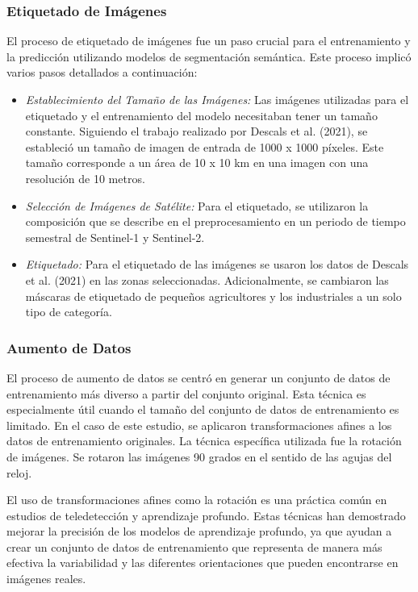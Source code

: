 \subsubsection{Etiquetado de Imágenes}
El proceso de etiquetado de imágenes fue un paso crucial para el entrenamiento y la predicción utilizando modelos de segmentación semántica. Este proceso implicó varios pasos detallados a continuación:

\begin{itemize}
    \item \textit{Establecimiento del Tamaño de las Imágenes:} Las imágenes utilizadas para el etiquetado y el entrenamiento del modelo necesitaban tener un tamaño constante. Siguiendo el trabajo realizado por Descals et al. (2021), se estableció un tamaño de imagen de entrada de 1000 x 1000 píxeles. Este tamaño corresponde a un área de 10 x 10 km en una imagen con una resolución de 10 metros.
    
    \item \textit{Selección de Imágenes de Satélite:} Para el etiquetado, se utilizaron la composición que se describe en el preprocesamiento en un periodo de tiempo semestral de Sentinel-1 y Sentinel-2.
    
    \item \textit{Etiquetado:} Para el etiquetado de las imágenes se usaron los datos de Descals et al. (2021) en las zonas seleccionadas. Adicionalmente, se cambiaron las máscaras de etiquetado de pequeños agricultores y los industriales a un solo tipo de categoría.
\end{itemize}

\subsubsection{Aumento de Datos}
El proceso de aumento de datos se centró en generar un conjunto de datos de entrenamiento más diverso a partir del conjunto original. Esta técnica es especialmente útil cuando el tamaño del conjunto de datos de entrenamiento es limitado. En el caso de este estudio, se aplicaron transformaciones afines a los datos de entrenamiento originales. La técnica específica utilizada fue la rotación de imágenes. Se rotaron las imágenes 90 grados en el sentido de las agujas del reloj.

El uso de transformaciones afines como la rotación es una práctica común en estudios de teledetección y aprendizaje profundo. Estas técnicas han demostrado mejorar la precisión de los modelos de aprendizaje profundo, ya que ayudan a crear un conjunto de datos de entrenamiento que representa de manera más efectiva la variabilidad y las diferentes orientaciones que pueden encontrarse en imágenes reales.

